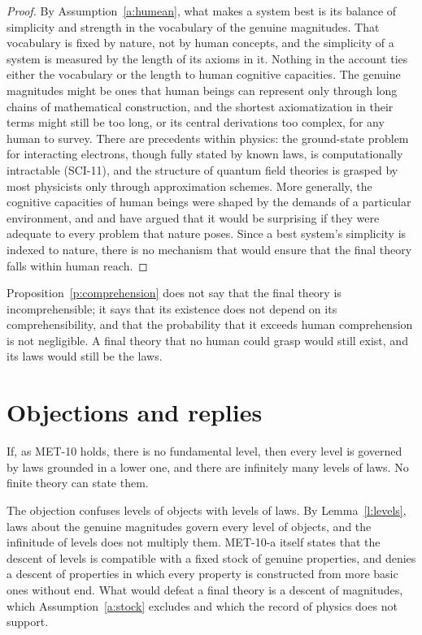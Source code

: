 \documentclass{situationist-preprint}
\begin{document}
\begin{proof}
By Assumption~\ref{a:humean}, what makes a system best is its balance of simplicity and strength in the vocabulary of the genuine magnitudes. That vocabulary is fixed by nature, not by human concepts, and the simplicity of a system is measured by the length of its axioms in it. Nothing in the account ties either the vocabulary or the length to human cognitive capacities. The genuine magnitudes might be ones that human beings can represent only through long chains of mathematical construction, and the shortest axiomatization in their terms might still be too long, or its central derivations too complex, for any human to survey. There are precedents within physics: the ground-state problem for interacting electrons, though fully stated by known laws, is computationally intractable (SCI-11), and the structure of quantum field theories is grasped by most physicists only through approximation schemes. More generally, the cognitive capacities of human beings were shaped by the demands of a particular environment, and \citet{McGinn1989} and \citet{Chomsky1975} have argued that it would be surprising if they were adequate to every problem that nature poses. Since a best system's simplicity is indexed to nature, there is no mechanism that would ensure that the final theory falls within human reach.
\end{proof}

Proposition~\ref{p:comprehension} does not say that the final theory is incomprehensible; it says that its existence does not depend on its comprehensibility, and that the probability that it exceeds human comprehension is not negligible. A final theory that no human could grasp would still exist, and its laws would still be the laws.

\section{Objections and replies}

\begin{objection}
If, as MET-10 holds, there is no fundamental level, then every level is governed by laws grounded in a lower one, and there are infinitely many levels of laws. No finite theory can state them.
\end{objection}

\begin{reply}
The objection confuses levels of objects with levels of laws. By Lemma~\ref{l:levels}, laws about the genuine magnitudes govern every level of objects, and the infinitude of levels does not multiply them. MET-10-a itself states that the descent of levels is compatible with a fixed stock of genuine properties, and denies a descent of properties in which every property is constructed from more basic ones without end. What would defeat a final theory is a descent of magnitudes, which Assumption~\ref{a:stock} excludes and which the record of physics does not support.
\end{reply}
\end{document}

